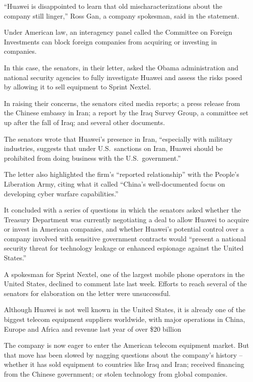 ﻿\documentclass[12pt]{article}
\begin{document}
``Huawei is disappointed to learn that old mischaracterizations about the company still linger,''
Ross Gan, a company spokesman, said in the statement.

Under American law, an interagency panel called the Committee on Foreign Investments can block
foreign companies from acquiring or investing in companies.

In this case, the senators, in their letter, asked the Obama administration and national security
agencies to fully investigate Huawei and assess the risks posed by allowing it to sell equipment to
Sprint Nextel.

In raising their concerns, the senators cited media reports; a press release from the Chinese
embassy in Iran; a report by the Iraq Survey Group, a committee set up after the fall of Iraq; and
several other documents.

The senators wrote that Huawei's presence in Iran, ``especially with military industries, suggests
that under U.S.~sanctions on Iran, Huawei should be prohibited from doing business with the
U.S.~government.''

The letter also highlighted the firm's ``reported relationship'' with the People's Liberation Army,
citing what it called ``China's well-documented focus on developing cyber warfare capabilities.''

It concluded with a series of questions in which the senators asked whether the Treasury Department
was currently negotiating a deal to allow Huawei to acquire or invest in American companies, and
whether Huawei's potential control over a company involved with sensitive government contracts would
``present a national security threat for technology leakage or enhanced espionage against the United
States.''

A spokesman for Sprint Nextel, one of the largest mobile phone operators in the United States,
declined to comment late last week. Efforts to reach several of the senators for elaboration on the
letter were unsuccessful.

Although Huawei is not well known in the United States, it is already one of the biggest telecom
equipment suppliers worldwide, with major operations in China, Europe and Africa and revenue last
year of over \$20 billion

The company is now eager to enter the American telecom equipment market. But that move has been
slowed by nagging questions about the company's history -- whether it has sold equipment to
countries like Iraq and Iran; received financing from the Chinese government; or stolen technology
from global companies.
\end{document}
